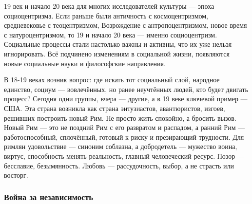 

19 век и начало 20 века для многих исследователей культуры --- эпоха социоцентризма. Если раньше были античность с космоцентризмом, средневековье с теоцентризмом, Возрождение с антропоцентризмом, новое время с натуроцентризмом, то 19 и начало 20 века --- именно социоцентризм. Социальные процессы стали настолько важны и активны, что их уже нельзя игнорировать. Всё подчинено изменениям в социальной жизни, появляются новые социальные науки и философские направления.

В 18-19 веках возник вопрос: где искать тот социальный слой, народное единство, социум --- вовлечённых, но ранее неучтённых людей, кто будет двигать процесс? Сегодня одни группы, вчера --- другие, а в 19 веке ключевой пример --- США. Эта страна возникла как страна энтузиастов, авантюристов, изгоев, решивших построить новый Рим. Не просто жить спокойно, а бросить вызов. Новый Рим --- это не поздний Рим с его развратом и распадом, а ранний Рим --- работоспособный, сплочённый, готовый к риску и презирающий трудности.
Для римлян удовольствие --- синоним соблазна, а добродетель --- мужество воина, виртус, способность менять реальность, главный человеческий ресурс. Позор --- бесславие, безымянность. Любовь --- рассудочность, выбор, а не страсть или восторг.

\subsubsection{Война за независимость}

